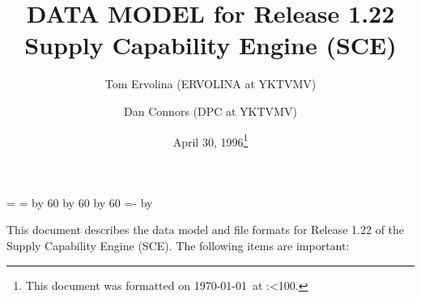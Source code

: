 \topmargin 0.0in
\headheight 0.0in
\headsep 0.0in
\textwidth 7.5in
\oddsidemargin -0.5in
\textheight 9in
\newcount\hh
\newcount\mm

\mm=\time
\hh=\time
\divide\hh by 60
\divide\mm by 60
\multiply\mm by 60
\mm=-\mm
\advance\mm by \time
\def\hhmm{\number\hh:\ifnum\mm<10{}0\fi\number\mm}


\title{DATA MODEL for Release 1.22  Supply Capability Engine (SCE)}
\author{Tom Ervolina (ERVOLINA at YKTVMV) \and Dan Connors  (DPC at YKTVMV)}
\date{April 30, 1996\footnote[2]{This document was 
formatted on \today\ at \hhmm.}}
\maketitle
This document describes the data model and file formats 
for Release 1.22 of the Supply Capability 
Engine (SCE).  The following items are important:
